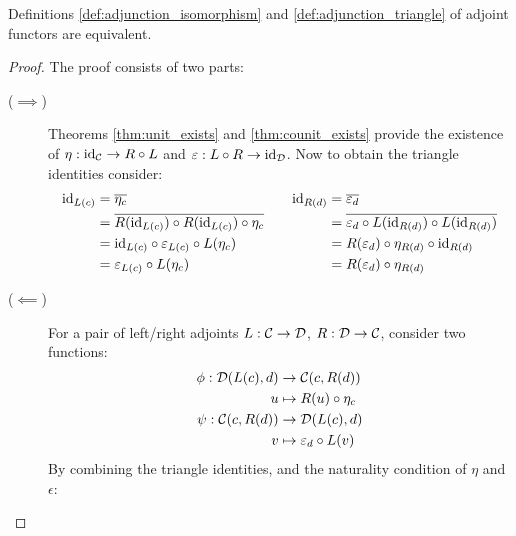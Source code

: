 \begin{theorem}
  Definitions \ref{def:adjunction_isomorphism} and \ref{def:adjunction_triangle}
  of adjoint functors are equivalent.

  \begin{proof}
    The proof consists of two parts:
    \begin{description}
      \item[($\implies$)] Theorems \ref{thm:unit_exists} and
        \ref{thm:counit_exists} provide the existence of $\eta: \mathrm{id}_{\mathcal{C}} \to
        R\circ L$ and $\varepsilon: L\circ R \to \mathrm{id}_{\mathcal{D}}$. Now to obtain the
        triangle identities consider:
        \[
          \begin{aligned}
            \mathrm{id}_{L(c)} &= \overline{\eta_c}\\
              &= \overline{R(\mathrm{id}_{L(c)})\circ R(\mathrm{id}_{L(c)})\circ \eta_c}\\
              &= \mathrm{id}_{L(c)} \circ \varepsilon_{L(c)}\circ L(\eta_c)\\
              &= \varepsilon_{L(c)}\circ L(\eta_c)
          \end{aligned}
          \qquad
          \begin{aligned}
            \mathrm{id}_{R(d)} &= \overline{\varepsilon_d}\\
              &= \overline{\varepsilon_d
                \circ L(\mathrm{id}_{R(d)})\circ L(\mathrm{id}_{R(d)})}\\
              &= R(\varepsilon_d) \circ \eta_{R(d)} \circ \mathrm{id}_{R(d)}\\
              &= R(\varepsilon_d) \circ \eta_{R(d)}
          \end{aligned}
        \]
      \item[($\impliedby$)] For a pair of left/right adjoints $L:\mathcal{C}\to \mathcal{D}$,
        $R:\mathcal{D}\to \mathcal{C}$, consider two functions:
        \[
          \begin{aligned}
            \phi: \mathcal{D}(L(c), d) &\to \mathcal{C}(c, R(d))\\
            u &\mapsto R(u)\circ \eta_c\\
            \psi: \mathcal{C}(c, R(d)) &\to \mathcal{D}(L(c), d)\\
            v &\mapsto \varepsilon_d \circ L(v)
          \end{aligned}
        \]
        By combining the triangle identities, and the naturality condition of $\eta$ and $\epsilon$:


\end{description}
\end{proof}
\end{theorem}

